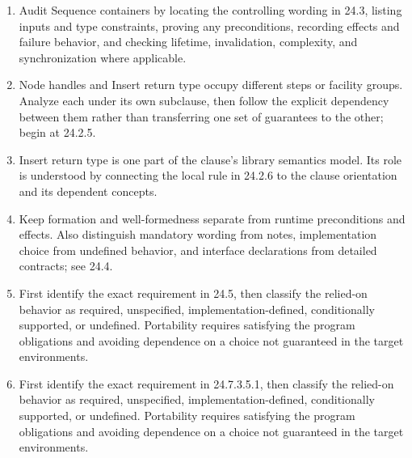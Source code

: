 \documentclass[11pt,letterpaper]{article}
\begin{document}
\begin{enumerate}
\item Audit Sequence containers by locating the controlling wording in 24.3, listing inputs and type constraints, proving any preconditions, recording effects and failure behavior, and checking lifetime, invalidation, complexity, and synchronization where applicable.
\item Node handles and Insert return type occupy different steps or facility groups. Analyze each under its own subclause, then follow the explicit dependency between them rather than transferring one set of guarantees to the other; begin at 24.2.5.
\item Insert return type is one part of the clause's library semantics model. Its role is understood by connecting the local rule in 24.2.6 to the clause orientation and its dependent concepts.
\item Keep formation and well-formedness separate from runtime preconditions and effects. Also distinguish mandatory wording from notes, implementation choice from undefined behavior, and interface declarations from detailed contracts; see 24.4.
\item First identify the exact requirement in 24.5, then classify the relied-on behavior as required, unspecified, implementation-defined, conditionally supported, or undefined. Portability requires satisfying the program obligations and avoiding dependence on a choice not guaranteed in the target environments.
\item First identify the exact requirement in 24.7.3.5.1, then classify the relied-on behavior as required, unspecified, implementation-defined, conditionally supported, or undefined. Portability requires satisfying the program obligations and avoiding dependence on a choice not guaranteed in the target environments.
\end{enumerate}
\end{document}
